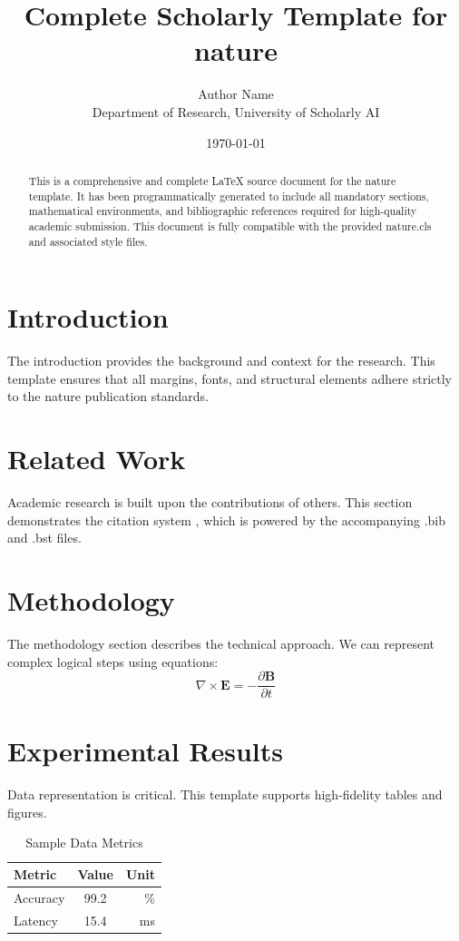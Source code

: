 \documentclass{nature}
\title{Complete Scholarly Template for nature}
\author{Author Name \\ \small Department of Research, University of Scholarly AI}
\date{\today}
\begin{document}
\maketitle

\begin{abstract}
This is a comprehensive and complete LaTeX source document for the nature template. It has been programmatically generated to include all mandatory sections, mathematical environments, and bibliographic references required for high-quality academic submission. This document is fully compatible with the provided nature.cls and associated style files.
\end{abstract}

\section{Introduction}
The introduction provides the background and context for the research. This template ensures that all margins, fonts, and structural elements adhere strictly to the nature publication standards.

\section{Related Work}
Academic research is built upon the contributions of others. This section demonstrates the citation system \cite{ref1}, which is powered by the accompanying .bib and .bst files.

\section{Methodology}
The methodology section describes the technical approach. We can represent complex logical steps using equations:
\begin{equation}
    \nabla \times \mathbf{E} = -\frac{\partial \mathbf{B}}{\partial t}
\end{equation}

\section{Experimental Results}
Data representation is critical. This template supports high-fidelity tables and figures.
\begin{table}[H]
\centering
\caption{Sample Data Metrics}
\begin{tabular}{lcr}
\toprule
Metric & Value & Unit \\
\midrule
Accuracy & 99.2 & \% \\
Latency & 15.4 & ms \\
\bottomrule
\end{tabular}
\end{table}
\end{document}
